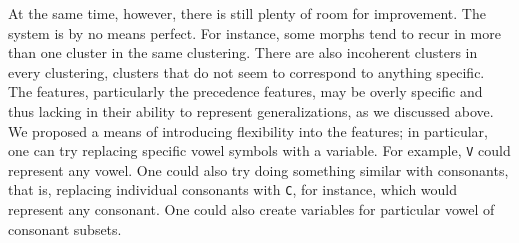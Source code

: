 At the same time, however, there is still plenty of room for improvement. The system is by no means perfect. For instance, some morphs tend to recur in more than one cluster in the same clustering. There are also incoherent clusters in every clustering, clusters that do not seem to correspond to anything specific.
The features, particularly the precedence features, may be overly specific and thus lacking in their ability to represent generalizations, as we discussed above. We proposed a means of introducing flexibility into the features; in particular, one can try replacing specific vowel symbols with a variable. For example, \texttt{V} could represent any vowel. One could also try doing something similar with consonants, that is, replacing individual consonants with \texttt{C}, for instance, which would represent any consonant. One could also create variables for particular vowel of consonant subsets. %



%


